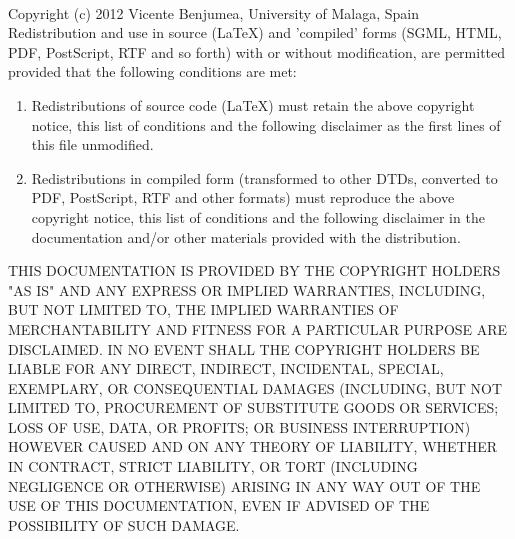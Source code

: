 \documentclass[a4paper]{article}
\begin{document}
\vspace*{\fill}\noindent
\begin{minipage}{\linewidth}\footnotesize
\hrulefill\\
\noindent
Copyright (c)  2012  Vicente Benjumea, University of Malaga, Spain\\

\noindent
Redistribution and use in source (LaTeX) and 'compiled' forms
(SGML, HTML, PDF, PostScript, RTF and so forth) with or without
modification, are permitted provided that the following conditions are
met:
\begin{enumerate}
\item Redistributions of source code (LaTeX) must retain the
      above copyright notice, this list of conditions and the
      following disclaimer as the first lines of this file unmodified.

\item Redistributions in compiled form (transformed to other DTDs,
      converted to PDF, PostScript, RTF and other formats) must
      reproduce the above copyright notice, this list of conditions
      and the following disclaimer in the documentation and/or other
      materials provided with the distribution.
\end{enumerate}
THIS DOCUMENTATION IS PROVIDED BY THE COPYRIGHT HOLDERS "AS IS" AND
ANY EXPRESS OR IMPLIED WARRANTIES, INCLUDING, BUT NOT LIMITED TO, THE
IMPLIED WARRANTIES OF MERCHANTABILITY AND FITNESS FOR A PARTICULAR
PURPOSE ARE DISCLAIMED. IN NO EVENT SHALL THE COPYRIGHT HOLDERS BE
LIABLE FOR ANY DIRECT, INDIRECT, INCIDENTAL, SPECIAL, EXEMPLARY, OR
CONSEQUENTIAL DAMAGES (INCLUDING, BUT NOT LIMITED TO, PROCUREMENT OF
SUBSTITUTE GOODS OR SERVICES; LOSS OF USE, DATA, OR PROFITS; OR
BUSINESS INTERRUPTION) HOWEVER CAUSED AND ON ANY THEORY OF LIABILITY,
WHETHER IN CONTRACT, STRICT LIABILITY, OR TORT (INCLUDING NEGLIGENCE
OR OTHERWISE) ARISING IN ANY WAY OUT OF THE USE OF THIS DOCUMENTATION,
EVEN IF ADVISED OF THE POSSIBILITY OF SUCH DAMAGE.
\end{minipage}


\end{document}
